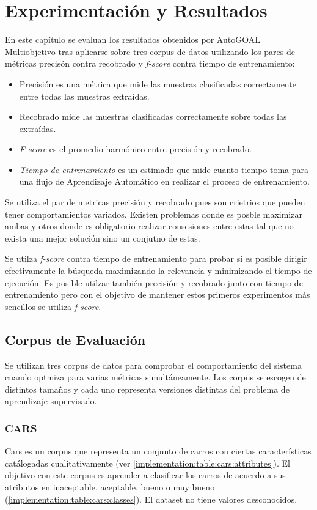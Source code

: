 \chapter{Experimentaci\'on y Resultados}\label{chapter:experiments}
En este cap\'itulo se evaluan los resultados obtenidos por AutoGOAL Multiobjetivo tras aplicarse sobre tres corpus de datos utilizando los pares de m\'etricas precis\'on contra recobrado y \textit{f-score} contra tiempo de entrenamiento:
\begin{itemize}
    \item Precisi\'on es una m\'etrica que mide las muestras clasificadas correctamente entre todas las muestras extra\'idas.
    \item Recobrado mide las muestras clasificadas correctamente sobre todas las extra\'idas.
    \item \textit{F-score} es el promedio harm\'onico entre precisi\'on y recobrado.
    \item \textit{Tiempo de entrenamiento} es un estimado que mide cuanto tiempo toma para una flujo de Aprendizaje Autom\'atico en realizar el proceso de entrenamiento.
\end{itemize}

Se utiliza el par de metricas precisi\'on y recobrado pues son crietrios que pueden tener comportamientos variados. Existen problemas donde es posble maximizar ambas y otros donde es obligatorio realizar consesiones entre estas tal que no exista una mejor soluci\'on sino un conjutno de estas.

Se utilza \textit{f-score} contra tiempo de entrenamiento para probar si es posible dirigir efectivamente  la b\'usqueda maximizando la relevancia y minimizando el tiempo de ejecuci\'on. Es posible utilzar tambi\'en precisi\'on y recobrado junto con tiempo de entrenamiento pero con el objetivo de mantener estos primeros experimentos m\'as sencillos se utiliza \textit{f-score}.

\section{Corpus de Evaluaci\'on}
Se utilizan tres corpus de datos para comprobar el comportamiento del sistema cuando optmiza para varias m\'etricas simult\'aneamente. Los corpus se escogen de distintos tamaños y cada uno representa versiones distintas del problema de aprendizaje supervisado.

\subsection{CARS}
Cars es un corpus que representa un conjunto de carros con ciertas caracter\'isticas cat\'alogadas cualitativamente (ver \ref{implementation:table:cars:attributes}). El objetivo con este corpus es aprender a clasificar los carros de  acuerdo a sus atributos  en inaceptable, aceptable, bueno o muy bueno (\ref{implementation:table:cars:classes}). El dataset no tiene valores desconocidos.

